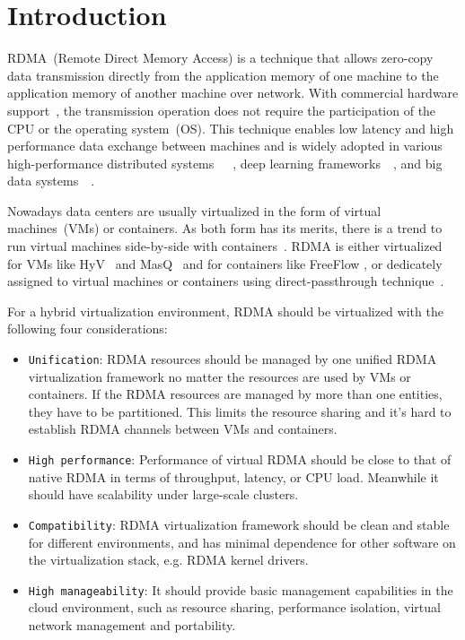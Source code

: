 \section{Introduction}
RDMA~(Remote Direct Memory Access) is a technique that allows zero-copy data transmission directly from the application memory of one machine to the application memory of another machine over network. With commercial hardware support~\cite{roce, iwarp, infiniband}, the transmission operation does not require the participation of the CPU or the operating system~(OS). This technique enables low latency and high performance data exchange between machines and is widely adopted in various high-performance distributed systems~\cite{dragojevic2014farm}~\cite{wei2015fast}~\cite{lu2017octopus}, deep learning frameworks~\cite{abadi2016tensorflow}~\cite{chen2015mxnet}, and big data systems~\cite{spark-rdma}~\cite{hadoop-rdma}.

Nowadays data centers are usually virtualized in the form of virtual machines~(VMs) or containers. As both form has its merits, there is a trend to run virtual machines side-by-side with containers~\cite{rethinkingvirtualization}. RDMA is either virtualized for VMs like HyV~\cite{pfefferle2015hybrid} and MasQ~\cite{he2020masq} and for containers like FreeFlow \cite{kim2019freeflow}, or dedicately assigned to virtual machines or containers using direct-passthrough technique~\cite{sr-iov}.

For a hybrid virtualization environment, RDMA should be virtualized with the following four considerations:

\begin{itemize}
	\item {\verb|Unification|}: RDMA resources should be managed by one unified RDMA virtualization framework no matter the resources are used by VMs or containers. If the RDMA resources are managed by more than one entities, they have to be partitioned. This limits the resource sharing and it's hard to establish RDMA channels between VMs and containers.
	\item {\verb|High performance|}: Performance of virtual RDMA should be close to that of native RDMA in terms of throughput, latency, or CPU load. Meanwhile it should have scalability under large-scale clusters.
	\item {\verb|Compatibility|}: RDMA virtualization framework should be clean and stable for different environments, and has minimal dependence for other software on the virtualization stack, e.g. RDMA kernel drivers.
	\item {\verb|High manageability|}: It should provide basic management capabilities in the cloud environment, such as resource sharing, performance isolation, virtual network management and portability.
\end{itemize}

